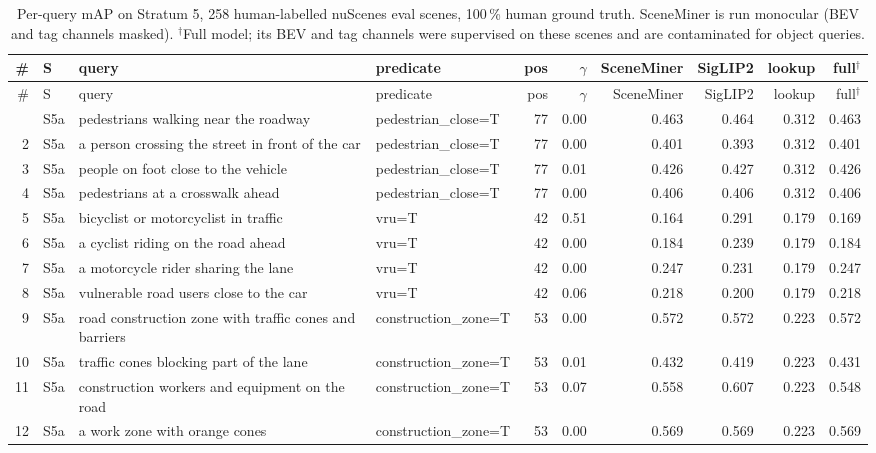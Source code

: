 \begin{longtable}{r l p{4.0cm} p{3.0cm} r r r r r r}
\caption{Per-query mAP on Stratum 5, 258 human-labelled nuScenes eval scenes, 100\,\% human ground truth. SceneMiner is run monocular (BEV and tag channels masked). $^\dagger$Full model; its BEV and tag channels were supervised on these scenes and are contaminated for object queries.}\label{tab:pq-sem}\\
\toprule
\# & S & query & predicate & pos & $\gamma$ & SceneMiner & SigLIP2 & lookup & full$^\dagger$\\
\midrule
\endfirsthead
\toprule
\# & S & query & predicate & pos & $\gamma$ & SceneMiner & SigLIP2 & lookup & full$^\dagger$\\
\midrule
\endhead
\bottomrule
\endfoot
1 & S5a & pedestrians walking near the roadway & pedestrian\_close=T & 77 & 0.00 & 0.463 & 0.464 & 0.312 & 0.463\\
2 & S5a & a person crossing the street in front of the car & pedestrian\_close=T & 77 & 0.00 & 0.401 & 0.393 & 0.312 & 0.401\\
3 & S5a & people on foot close to the vehicle & pedestrian\_close=T & 77 & 0.01 & 0.426 & 0.427 & 0.312 & 0.426\\
4 & S5a & pedestrians at a crosswalk ahead & pedestrian\_close=T & 77 & 0.00 & 0.406 & 0.406 & 0.312 & 0.406\\
5 & S5a & bicyclist or motorcyclist in traffic & vru=T & 42 & 0.51 & 0.164 & 0.291 & 0.179 & 0.169\\
6 & S5a & a cyclist riding on the road ahead & vru=T & 42 & 0.00 & 0.184 & 0.239 & 0.179 & 0.184\\
7 & S5a & a motorcycle rider sharing the lane & vru=T & 42 & 0.00 & 0.247 & 0.231 & 0.179 & 0.247\\
8 & S5a & vulnerable road users close to the car & vru=T & 42 & 0.06 & 0.218 & 0.200 & 0.179 & 0.218\\
9 & S5a & road construction zone with traffic cones and barriers & construction\_zone=T & 53 & 0.00 & 0.572 & 0.572 & 0.223 & 0.572\\
10 & S5a & traffic cones blocking part of the lane & construction\_zone=T & 53 & 0.01 & 0.432 & 0.419 & 0.223 & 0.431\\
11 & S5a & construction workers and equipment on the road & construction\_zone=T & 53 & 0.07 & 0.558 & 0.607 & 0.223 & 0.548\\
12 & S5a & a work zone with orange cones & construction\_zone=T & 53 & 0.00 & 0.569 & 0.569 & 0.223 & 0.569\\

\end{longtable}
